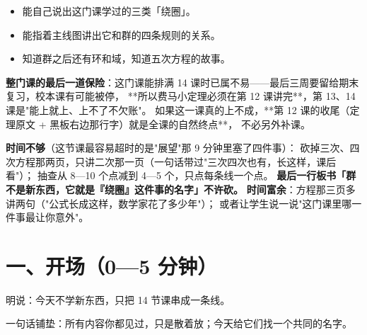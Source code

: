 

\begin{mubiao}
  \begin{itemize}
    \item 能自己说出这门课学过的三类「绕圈」。
    \item 能指着主线图讲出它和群的四条规则的关系。
    \item 知道群之后还有环和域，知道五次方程的故事。
  \end{itemize}
\end{mubiao}


\begin{beifen}
  \textbf{整门课的最后一道保险}：这门课能排满 14 课时已属不易——最后三周要留给期末复习，校本课有可能被停，
  **所以费马小定理必须在第 12 课讲完**，第 13、14 课是"能上就上、上不了不欠账"。
  如果这一课真的上不成，**第 12 课的收尾（定理原文 + 黑板右边那行字）就是全课的自然终点**，
  不必另外补课。
\end{beifen}

\begin{beifen}
  \textbf{时间不够}（这节课最容易超时的是"展望"那 9 分钟里塞了四件事）：
  砍掉三次、四次方程那两页，只讲二次那一页（一句话带过"三次四次也有，长这样，课后看"）；
  抽查从 8—10 个点减到 4—5 个，只点每条线一个点。
  \textbf{最后一行板书「群不是新东西，它就是『绕圈』这件事的名字」不许砍。}
  \textbf{时间富余}：方程那三页多讲两句（"公式长成这样，数学家花了多少年"）；
  或者让学生说一说"这门课里哪一件事最让你意外"。
\end{beifen}

\section*{一、开场（0—5 分钟）}

明说：今天不学新东西，只把 14 节课串成一条线。

一句话铺垫：所有内容你都见过，只是散着放；今天给它们找一个共同的名字。

